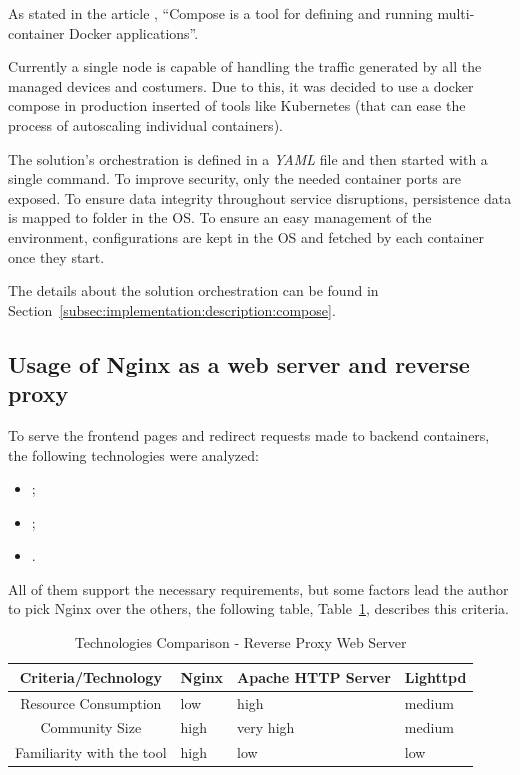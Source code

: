 As stated in the article , ``Compose is a tool for defining and running multi-container Docker applications''.

Currently a single node is capable of handling the traffic generated by all the managed devices and costumers. Due to this, it was decided to use a docker compose in production inserted of tools like Kubernetes (that can ease the process of autoscaling individual containers).

The solution's orchestration is defined in a \textit{YAML} file and then started with a single command. To improve security, only the needed container ports are exposed. To ensure data integrity throughout service disruptions, persistence data is mapped to folder in the \gls{OS}. To ensure an easy management of the environment, configurations are kept in the \gls{OS} and fetched by each container once they start.

The details about the solution orchestration can be found in Section~\ref{subsec:implementation:description:compose}.

\subsection{Usage of Nginx as a web server and reverse proxy}
\label{subsec:implementation:decisions:nginx}

To serve the frontend pages and redirect requests made to backend containers, the following technologies were analyzed:

\begin{itemize}
    \item {};
    \item {};
    \item {}.
\end{itemize}

All of them support the necessary requirements, but some factors lead the author to pick Nginx over the others, the following table, Table~\ref{tab:implementation:decisions:nginx:compare}, describes this criteria.

\begin{table}[H]
    \caption{Technologies Comparison - Reverse Proxy Web Server}
    \label{tab:implementation:decisions:nginx:compare}
    \centering
    \begin{tabular}{@{}clll@{}}
    \toprule
    \textbf{Criteria/Technology} & \textbf{Nginx} & \textbf{Apache HTTP Server} & \textbf{Lighttpd} \\ \midrule
    Resource Consumption      & low  & high      & medium \\ \midrule
    Community Size            & high & very high & medium \\ \midrule
    Familiarity with the tool & high & low       & low    \\ \bottomrule
    \end{tabular}
\end{table}

